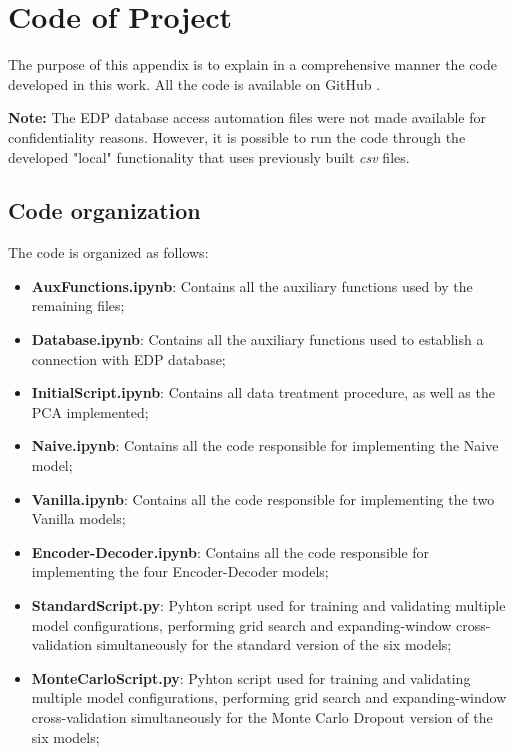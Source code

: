 \chapter{Code of Project}
\label{chapter:appendixA}


The purpose of this appendix is to explain in a comprehensive manner the code developed in this work. All the code is available on GitHub \cite{code}.

\textbf{Note:} The EDP database access automation files were not made available for confidentiality reasons. However, it is possible to run the code through the developed "local" functionality that uses previously built \textit{csv} files.

\section{Code organization}
The code is organized as follows:
\begin{itemize}
    \item \textbf{AuxFunctions.ipynb}: Contains all the auxiliary functions used by the remaining files;
    \item \textbf{Database.ipynb}: Contains all the auxiliary functions used to establish a connection with EDP database;
    \item \textbf{InitialScript.ipynb}: Contains all data treatment procedure, as well as the \ac{PCA} implemented;
    \item \textbf{Naive.ipynb}: Contains all the code responsible for implementing the Naive model;
    \item \textbf{Vanilla.ipynb}: Contains all the code responsible for implementing the two Vanilla models;
    \item \textbf{Encoder-Decoder.ipynb}: Contains all the code responsible for implementing the four Encoder-Decoder models;
    \item \textbf{StandardScript.py}: Pyhton script used for training and validating multiple model configurations, performing grid search and expanding-window cross-validation simultaneously for the standard version of the six models;
    \item \textbf{MonteCarloScript.py}: Pyhton script used for training and validating multiple model configurations, performing grid search and expanding-window cross-validation simultaneously for the Monte Carlo Dropout version of the six models;
\end{itemize}

